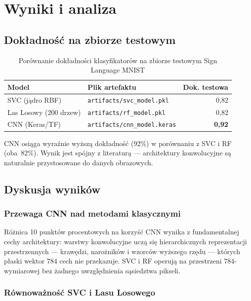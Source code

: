 \chapter{Wyniki i analiza}
\label{cha:elementyPracy}

\section{Dokładność na zbiorze testowym}

\begin{table}[H]
    \centering
    \caption{Porównanie dokładności klasyfikatorów na zbiorze testowym Sign Language MNIST}
    \label{tab:wyniki}
    \begin{tabular}{llr}
        \toprule
        \textbf{Model} & \textbf{Plik artefaktu} & \textbf{Dok. testowa} \\
        \midrule
        SVC (jądro RBF)        & \texttt{artifacts/svc\_model.pkl}   & 0{,}82 \\
        Las Losowy (200 drzew) & \texttt{artifacts/rf\_model.pkl}    & 0{,}82 \\
        CNN (Keras/TF)         & \texttt{artifacts/cnn\_model.keras} & \textbf{0{,}92} \\
        \bottomrule
    \end{tabular}
\end{table}

CNN osiąga wyraźnie wyższą dokładność (92\%) w porównaniu z SVC i RF (oba~82\%).
Wynik jest spójny z literaturą --- architektury konwolucyjne są naturalnie
przystosowane do danych obrazowych.

\section{Dyskusja wyników}

\subsection{Przewaga CNN nad metodami klasycznymi}

Różnica 10 punktów procentowych na korzyść CNN wynika z fundamentalnej cechy
architektury: warstwy konwolucyjne uczą się hierarchicznych reprezentacji
przestrzennych --- krawędzi, narożników i wzorców wyższego rzędu --- których
płaski wektor 784 cech nie przekazuje. SVC i RF operują na przestrzeni
784-wymiarowej bez żadnego uwzględnienia sąsiedztwa pikseli.

\subsection{Równoważność SVC i Lasu Losowego}

